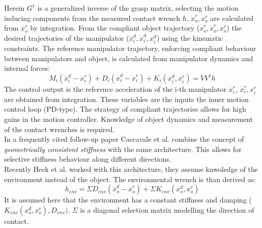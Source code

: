 \documentclass[a4paper,twoside, openright,12pt]{report}
\begin{document}
Herein $ G^\dagger $ is a generalized inverse of the grasp matrix, selecting the motion inducing components from the measured contact wrench $ h $. $ \dot{x}_o^r, x_o^r $ are calculated from $ \ddot{x}_o^r $ by integration.
From the compliant object trajectory ($ \ddot{x}_o^r,\dot{x}_o^r,x_o^r $) the desired trajectories of the manipulator ($ \ddot{x}_i^d,\dot{x}_i^d,x_i^d $) using the kinematic constraints. The reference manipulator trajectory, enforcing compliant behaviour between manipulators and object, is calculated from manipulator dynamics and internal forces: 
\begin{equation}
M_i(\ddot{x}_i^d - \ddot{x}_i^r) + D_i (\dot{x}_i^d - \dot{x}_i^r) + K_i(x_i^d,x_i^r) = VV^\dagger h
\end{equation}
The control output is the reference acceleration of the i-th manipulator $ \ddot{x}_i^r $, $ \dot{x}_i^r,x_i^r $ are obtained from integration. These variables are the inputs the inner motion control loop (PD-type). The strategy of compliant trajectories allows for high gains in the motion controller. Knowledge of object dynamics and measurement of the contact wrenches is required.\\
In a frequently cited follow-up paper Caccavale et al. \cite{Caccavale_08} combine the concept of \emph{geometrically consistent stiffness} with the same architecture. This allows for selective stiffness behaviour along different directions.\\
Recently Heck et al. worked with this architecture, they assume knwoledge of the environment instead of the object.
The environmental wrench is than derived as:
\begin{equation}
h_{env} =  \Sigma D_{env} (\dot{x}_o^d - \dot{x}_o^r)  + \Sigma K_{env}(x_o^d,x_o^r)
\end{equation}
It is assumed here that the environment has a constant stiffness and damping ($ K_{env}(x_o^d,x_o^r),D_{env}) $. $ \Sigma $ is a diagonal selection matrix modelling the direction of contact.
  
\end{document}
